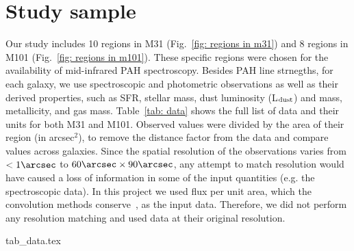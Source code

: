 
\section{Study sample}
\label{Sec: data_SOMN}

Our study includes 10 regions in M31 (Fig.~\ref{fig: regions in m31}) and 8 regions in M101 (Fig.~\ref{fig: regions in m101}). 
These specific regions were chosen for the availability of mid-infrared PAH spectroscopy.
Besides PAH line strnegths, for each galaxy, we use spectroscopic and photometric observations as well as their derived properties, such as SFR, stellar mass, dust luminosity (L$_{\rm dust}$) and mass, metallicity, and gas mass.
Table~\ref{tab: data} shows the full list of data and their units for both M31 and M101.
Observed values were divided by the area of their region (in arcsec$^2$), to remove the distance factor from the data and compare values across galaxies.
Since the spatial resolution of the observations varies from $<1\arcsec$ to $60\arcsec \times 90 \arcsec$, any attempt to match resolution would have caused a loss of information in some of the input quantities (e.g. the spectroscopic data).
In this project we used flux per unit area, which the convolution methods conserve~\citep{Aniano12}, as the input data.
Therefore, we did not perform any resolution matching and used data at their original resolution. %


{tab_data.tex}


